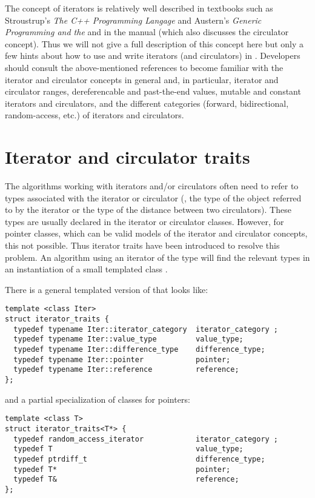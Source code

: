 The concept of iterators is relatively well described in textbooks such as 
Stroustrup's {\em The C++ Programming Langage} \cite{cgal:s-cpl-97} 
and Austern's {\em Generic Programming and the \stl} \cite{cgal:a-gps-98}
and in the
 manual (which also
discusses the circulator concept).
Thus we will not give a full description of this concept here
but only a few hints about how to use and write iterators (and circulators)
in \cgal.  Developers should consult the above-mentioned references to become
familiar with the iterator and circulator concepts in general and, in
particular, iterator and circulator ranges, dereferencable and past-the-end 
values, mutable and constant iterators and circulators, and the different 
categories (forward, bidirectional, random-access, etc.) of iterators and 
circulators.


\section{Iterator and circulator traits\label{sec:iterator_traits}}

The algorithms working with iterators and/or circulators often need to refer
to types associated with the iterator or circulator (\eg,
the type of the object referred to by the iterator
or the type of the distance between two circulators).
These types are usually declared in the iterator or circulator classes. 
However, for pointer classes, which can be valid models of the iterator
and circulator concepts,  this not possible. 
Thus iterator traits have been introduced to resolve this problem.
An algorithm using an iterator of the type  will find the 
relevant types in an instantiation of a small templated class 
.

There is a  general templated version
of  that looks like:
\begin{verbatim}
template <class Iter> 
struct iterator_traits {
  typedef typename Iter::iterator_category  iterator_category ;
  typedef typename Iter::value_type         value_type;
  typedef typename Iter::difference_type    difference_type;
  typedef typename Iter::pointer            pointer;
  typedef typename Iter::reference          reference;
};
\end{verbatim}
and a partial specialization of  classes for pointers:
\begin{verbatim}
template <class T> 
struct iterator_traits<T*> {
  typedef random_access_iterator            iterator_category ;
  typedef T                                 value_type;
  typedef ptrdiff_t                         difference_type;
  typedef T*                                pointer;
  typedef T&                                reference;
};
\end{verbatim}

